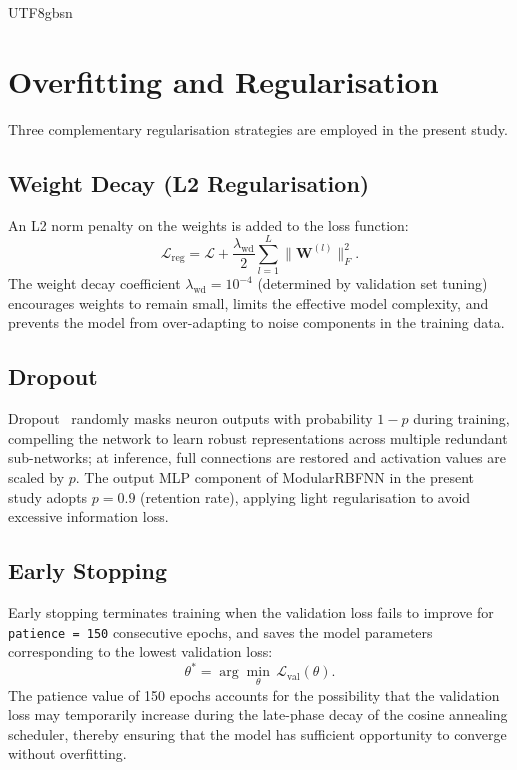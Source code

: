 \documentclass[a4paper,12pt]{report}
\begin{document}
\begin{CJK}{UTF8}{gbsn}
\section{Overfitting and Regularisation}
\label{sec:regularisation}

Three complementary regularisation strategies are employed in the present study.

\subsection{Weight Decay (L2 Regularisation)}
\label{subsec:weight_decay}

An L2 norm penalty on the weights is added to the loss function:
\begin{equation}
  \mathcal{L}_{\text{reg}} = \mathcal{L} + \frac{\lambda_{\text{wd}}}{2}
    \sum_{l=1}^{L} \|\mathbf{W}^{(l)}\|_F^2.
  \label{eq:weight_decay}
\end{equation}
The weight decay coefficient $\lambda_{\text{wd}} = 10^{-4}$ (determined by validation
set tuning) encourages weights to remain small, limits the effective model complexity,
and prevents the model from over-adapting to noise components in the training data.

\subsection{Dropout}
\label{subsec:dropout}

Dropout~\cite{srivastava2014} randomly masks neuron outputs with probability $1-p$
during training, compelling the network to learn robust representations across multiple
redundant sub-networks; at inference, full connections are restored and activation values
are scaled by $p$. The output MLP component of ModularRBFNN in the present study adopts
$p = 0.9$ (retention rate), applying light regularisation to avoid excessive information
loss.

\subsection{Early Stopping}
\label{subsec:early_stopping}

Early stopping terminates training when the validation loss fails to improve for
\texttt{patience = 150} consecutive epochs, and saves the model parameters corresponding
to the lowest validation loss:
\begin{equation}
  \theta^* = \arg\min_\theta\, \mathcal{L}_{\text{val}}(\theta).
  \label{eq:early_stopping}
\end{equation}
The patience value of 150 epochs accounts for the possibility that the validation loss
may temporarily increase during the late-phase decay of the cosine annealing scheduler,
thereby ensuring that the model has sufficient opportunity to converge without overfitting.


\end{CJK}
\end{document}
